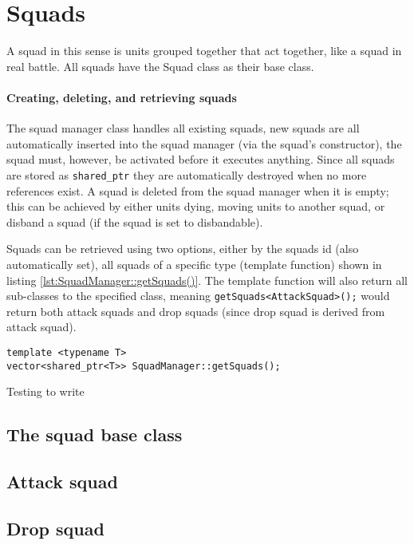\section{Squads}
A squad in this sense is units grouped together that act together, like a squad in real battle. All squads have the Squad class as their base class. 

\paragraph{Creating, deleting, and retrieving squads}
The squad manager class handles all existing squads, new squads are all automatically inserted into the squad manager (via the squad's constructor), the squad must, however, be activated before it executes anything. Since all squads are stored as \texttt{shared\_ptr} they are automatically destroyed when no more references exist. A squad is deleted from the squad manager when it is empty; this can be achieved by either units dying, moving units to another squad, or disband a squad (if the squad is set to disbandable).

Squads can be retrieved using two options, either by the squads id (also automatically set), all squads of a specific type (template function) shown in listing \ref{lst:SquadManager::getSquads()}. The template function will also return all sub-classes to the specified class, meaning \texttt{getSquads<AttackSquad>();} would return both attack squads and drop squads (since drop squad is derived from attack squad).
\begin{lstlisting}[caption={Template function to retrieve squads of the specified type.},label={lst:SquadManager::getSquads()}]
template <typename T>
vector<shared_ptr<T>> SquadManager::getSquads();
\end{lstlisting}
Testing to write

\subsection{The squad base class}


\subsection{Attack squad}

\subsection{Drop squad}

